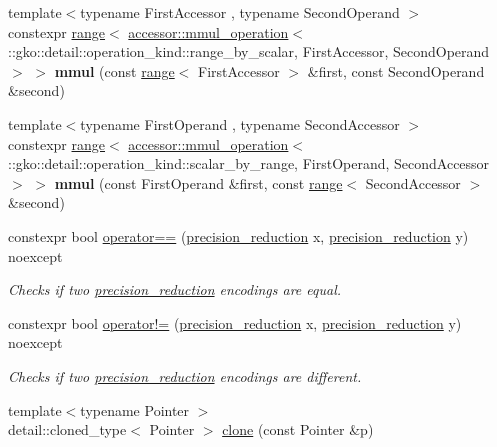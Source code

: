 \begin{DoxyCompactItemize}
\item 
\mbox{\label{namespacegko_a0eb6555448ea2dc4bcd3004eb7fa6479}} 
{\footnotesize template$<$typename First\+Accessor , typename Second\+Operand $>$ }\\constexpr \hyperlink{classgko_1_1range}{range}$<$ \hyperlink{structgko_1_1accessor_1_1mmul__operation}{accessor\+::mmul\+\_\+operation}$<$ \+::gko\+::detail\+::operation\+\_\+kind\+::range\+\_\+by\+\_\+scalar, First\+Accessor, Second\+Operand $>$ $>$ {\bfseries mmul} (const \hyperlink{classgko_1_1range}{range}$<$ First\+Accessor $>$ \&first, const Second\+Operand \&second)
\item 
\mbox{\label{namespacegko_a2193d82004fe19f7fa1d9441e7e179c1}} 
{\footnotesize template$<$typename First\+Operand , typename Second\+Accessor $>$ }\\constexpr \hyperlink{classgko_1_1range}{range}$<$ \hyperlink{structgko_1_1accessor_1_1mmul__operation}{accessor\+::mmul\+\_\+operation}$<$ \+::gko\+::detail\+::operation\+\_\+kind\+::scalar\+\_\+by\+\_\+range, First\+Operand, Second\+Accessor $>$ $>$ {\bfseries mmul} (const First\+Operand \&first, const \hyperlink{classgko_1_1range}{range}$<$ Second\+Accessor $>$ \&second)
\item 
constexpr bool \hyperlink{namespacegko_a4dbafa6e062c2036991ec8c3f6b201cf}{operator==} (\hyperlink{classgko_1_1precision__reduction}{precision\+\_\+reduction} x, \hyperlink{classgko_1_1precision__reduction}{precision\+\_\+reduction} y) noexcept
\begin{DoxyCompactList}\small\item\em Checks if two \hyperlink{classgko_1_1precision__reduction}{precision\+\_\+reduction} encodings are equal. \end{DoxyCompactList}\item 
constexpr bool \hyperlink{namespacegko_a61d408b4cd77aae6cac7a40c8307fddb}{operator!=} (\hyperlink{classgko_1_1precision__reduction}{precision\+\_\+reduction} x, \hyperlink{classgko_1_1precision__reduction}{precision\+\_\+reduction} y) noexcept
\begin{DoxyCompactList}\small\item\em Checks if two \hyperlink{classgko_1_1precision__reduction}{precision\+\_\+reduction} encodings are different. \end{DoxyCompactList}\item 
{\footnotesize template$<$typename Pointer $>$ }\\detail\+::cloned\+\_\+type$<$ Pointer $>$ \hyperlink{namespacegko_a1beb80750459e4201aa9d882d2d074c3}{clone} (const Pointer \&p)

\end{DoxyCompactItemize}
